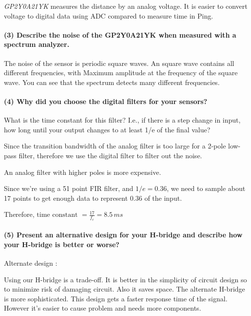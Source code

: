 \documentclass[a4paper]{article}
\begin{document}
\emph{GP2Y0A21YK} measures the distance by an analog voltage. It is easier to convert voltage to digital data using ADC compared to measure time in Ping.

\paragraph{(3) Describe the noise of the \textbf{GP2Y0A21YK} when measured with a spectrum analyzer. \\ }

The noise of the sensor is periodic square waves. An square wave contains all different frequencies, with Maximum amplitude at the frequency of the square wave.
You can see that the spectrum detects many different frequencies.

\paragraph{(4) Why did you choose the digital filters for your sensors? \\ }
What is the time constant for this filter? I.e., if there is a step change in input, how long until your output changes to at least 1/e of the final value?

Since the transition bandwidth of the analog filter is too large for a 2-pole low-pass filter, therefore we use the digital filter to filter out the noise. 

An analog filter with higher poles is more expensive. 

Since we're using a 51 point FIR filter, and $1/e = 0.36$, we need to sample about 17 points to get enough data to represent 0.36 of the input. 

Therefore, $\text{time constant } = \frac{17}{f_c} = 8.5 \, ms$

\paragraph{(5) Present an alternative design for your H-bridge and describe how your H-bridge is better or worse? \\ }

Alternate design :

Using our H-bridge is a trade-off. It is better in the simplicity of circuit design so to minimize risk of damaging circuit. Also it saves space. The alternate H-bridge is more sophisticated. This design gets a faster response time of the signal. However it's easier to cause problem and needs more components.
\end{document}
